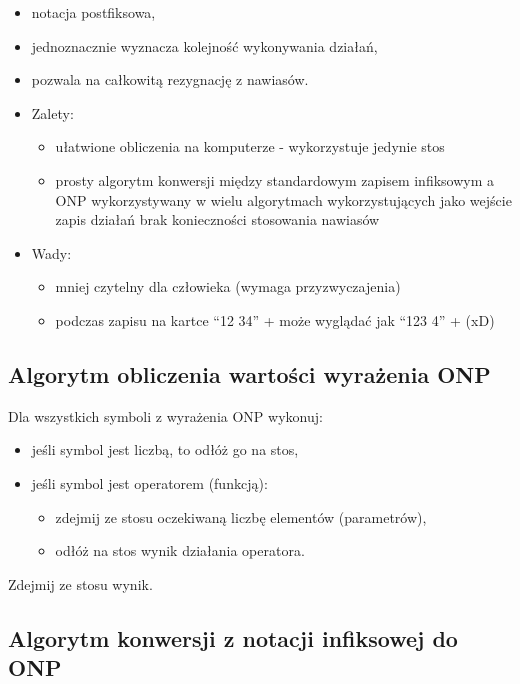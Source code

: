 \documentclass[main.tex]{subfiles}
\begin{document}
    \begin{itemize}[noitemsep]
        \item notacja postfiksowa,
        \item jednoznacznie wyznacza kolejność wykonywania działań,
        \item pozwala na całkowitą rezygnację z nawiasów.
        \item Zalety:
        \begin{itemize}
            \item ułatwione obliczenia na komputerze - wykorzystuje jedynie stos
            \item prosty algorytm konwersji między standardowym zapisem infiksowym a ONP
            wykorzystywany w wielu algorytmach wykorzystujących jako wejście zapis działań
            brak konieczności stosowania nawiasów
        \end{itemize}
        \item Wady:
        \begin{itemize}
            \item mniej czytelny dla człowieka (wymaga przyzwyczajenia)
            \item podczas zapisu na kartce ``12 34'' + może wyglądać jak ``123 4'' + (xD)
        \end{itemize}
    \end{itemize}

    \subsection{Algorytm obliczenia wartości wyrażenia ONP}
    Dla wszystkich symboli z wyrażenia ONP wykonuj:
    \begin{itemize}[noitemsep]
        \item jeśli symbol jest liczbą, to odłóż go na stos,
        \item jeśli symbol jest operatorem (funkcją):
        \begin{itemize}[noitemsep]
            \item zdejmij ze stosu oczekiwaną liczbę elementów (parametrów),
            \item odłóż na stos wynik działania operatora.
        \end{itemize}
    \end{itemize}
    Zdejmij ze stosu wynik.

    \subsection{Algorytm konwersji z notacji infiksowej do ONP}
\end{document}
